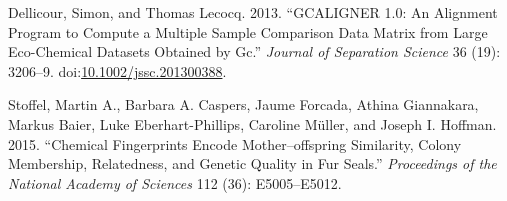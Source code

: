 \documentclass[]{article}
\begin{document}
\hypertarget{refs}{}
\hypertarget{ref-Dellicour.2013}{}
Dellicour, Simon, and Thomas Lecocq. 2013. ``GCALIGNER 1.0: An Alignment
Program to Compute a Multiple Sample Comparison Data Matrix from Large
Eco-Chemical Datasets Obtained by Gc.'' \emph{Journal of Separation
Science} 36 (19): 3206--9.
doi:\href{https://doi.org/10.1002/jssc.201300388}{10.1002/jssc.201300388}.

\hypertarget{ref-Stoffel.2015}{}
Stoffel, Martin A., Barbara A. Caspers, Jaume Forcada, Athina
Giannakara, Markus Baier, Luke Eberhart-Phillips, Caroline Müller, and
Joseph I. Hoffman. 2015. ``Chemical Fingerprints Encode
Mother--offspring Similarity, Colony Membership, Relatedness, and
Genetic Quality in Fur Seals.'' \emph{Proceedings of the National
Academy of Sciences} 112 (36): E5005--E5012.
\end{document}
